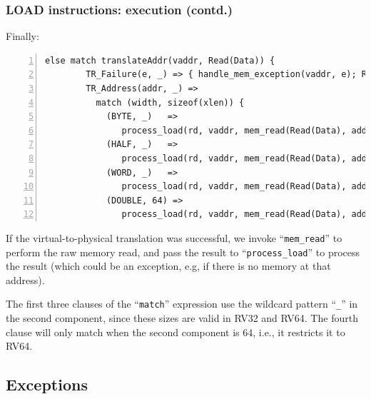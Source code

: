 \documentclass[aspectratio=169]{beamer}
\newcommand{\slidefont}{\scriptsize}
\newcommand{\cf}{\scriptsize\tt}
\begin{document}

\begin{frame}[fragile]
  \frametitle{LOAD instructions: execution (contd.)}

  \slidefont

  Finally:

  \begin{Verbatim}[frame=single, numbers=left, label = File riscv\_insts\_base.sail]
      else match translateAddr(vaddr, Read(Data)) {
        TR_Failure(e, _) => { handle_mem_exception(vaddr, e); RETIRE_FAIL },
        TR_Address(addr, _) =>
          match (width, sizeof(xlen)) {
            (BYTE, _)   =>
               process_load(rd, vaddr, mem_read(Read(Data), addr, 1, aq, rl, false), is_unsigned),
            (HALF, _)   =>
               process_load(rd, vaddr, mem_read(Read(Data), addr, 2, aq, rl, false), is_unsigned),
            (WORD, _)   =>
               process_load(rd, vaddr, mem_read(Read(Data), addr, 4, aq, rl, false), is_unsigned),
            (DOUBLE, 64) =>
               process_load(rd, vaddr, mem_read(Read(Data), addr, 8, aq, rl, false), is_unsigned)
  \end{Verbatim}

  \begin{minipage}{\textwidth}
    If the virtual-to-physical translation was successful, we invoke
    ``{\cf mem\_read}'' to perform the raw memory read, and pass the
    result to ``{\cf process\_load}'' to process the result (which
    could be an exception, e.g, if there is no memory at that
    address).

    \vspace{1ex}

    The first three clauses of the ``{\cf match}'' expression use the
    wildcard pattern ``{\cf \_}'' in the second component, since these
    sizes are valid in RV32 and RV64.  The fourth clause will only
    match when the second component is 64, i.e., it restricts it to
    RV64.

  \end{minipage}


\end{frame}


\subsection{Exceptions}

\end{document}
